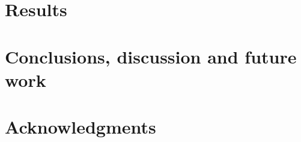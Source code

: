 \documentclass[letterpaper]{article}
\begin{document}
	    
	
	\section{Results}
	\label{sec:res}
	
	\section{Conclusions, discussion and future work}
	
	\section{Acknowledgments}
	
	
	
	
\end{document}
